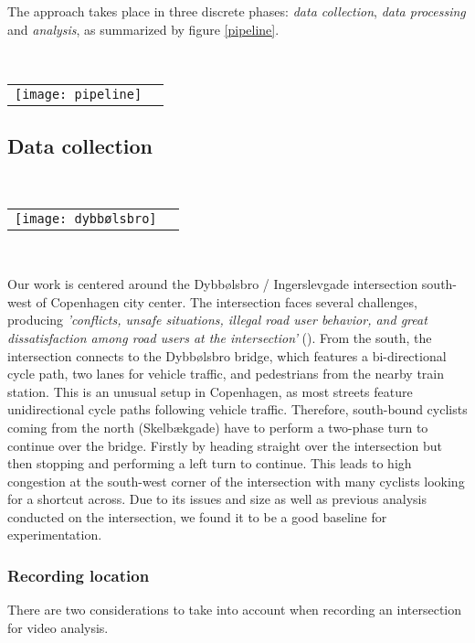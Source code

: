 The approach takes place in three discrete phases: \textit{data collection}, \textit{data processing} and \textit{analysis}, as summarized
by figure \ref{pipeline}.

\ \\ 
\raggedbottom
\begin{tabular}{@{}cc}
\texttt{[image: pipeline]} 
\end{tabular}
\label{pipeline}

\subsection{Data collection}
\ \\ 
\noindent
\begin{tabular}{@{}cc}
\texttt{[image: dybbølsbro]}
\end{tabular}
\label{intersection_overview}
\

Our work is centered around the Dybbølsbro / Ingerslevgade intersection south-west of Copenhagen
city center. The intersection faces several challenges, producing \textit{'conflicts, unsafe situations, illegal 
road user behavior, and great dissatisfaction among road users at the intersection'} (\cite{CPHpost_2021}).
From the south, the intersection connects to the Dybbølsbro bridge, which features a bi-directional cycle path, two
lanes for vehicle traffic, and pedestrians from the nearby train station. 
This is an unusual setup in Copenhagen, as most streets feature unidirectional cycle paths 
following vehicle traffic. Therefore, south-bound cyclists coming from the north (Skelbækgade) have to perform a two-phase 
turn to continue over the bridge. Firstly by heading straight over the intersection but then stopping and performing a left turn to 
continue. This leads to high congestion at the south-west corner of the intersection with many cyclists looking for a shortcut across. 
Due to its issues and size as well as previous analysis conducted on the intersection, we found it to be a good baseline for experimentation.

\subsubsection{Recording location}
There are two considerations to take into account when recording an intersection for video analysis.
\ \\
 
